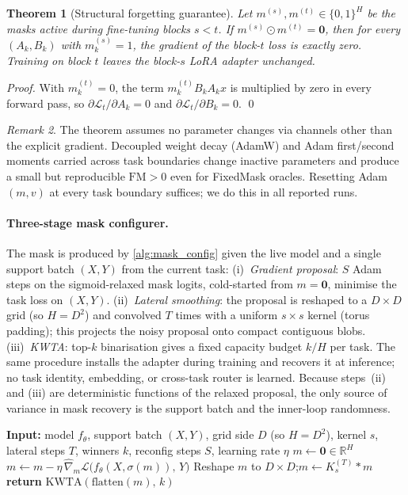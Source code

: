 \documentclass{article}
\theoremstyle{plain}
\newtheorem{theorem}{Theorem}[section]
\theoremstyle{remark}
\newtheorem{remark}[theorem]{Remark}
\begin{document}
\begin{theorem}[Structural forgetting guarantee]
\label{thm:isolation}
Let $m^{(s)},m^{(t)}\in\{0,1\}^H$ be the masks active during fine-tuning blocks $s<t$. If $m^{(s)}\odot m^{(t)} = \mathbf{0}$, then for every $(A_k,B_k)$ with $m^{(s)}_k=1$, the gradient of the block-$t$ loss is exactly zero. Training on block $t$ leaves the block-$s$ LoRA adapter unchanged.
\end{theorem}
\begin{proof}
With $m^{(t)}_k=0$, the term $m^{(t)}_k B_k A_k x$ is multiplied by zero in every forward pass, so $\partial\mathcal{L}_t/\partial A_k = 0$ and $\partial\mathcal{L}_t/\partial B_k = 0$. \qed
\end{proof}
\begin{remark}\label{rem:caveats}
The theorem assumes no parameter changes via channels other than the explicit gradient. Decoupled weight decay (AdamW) and Adam first/second moments carried across task boundaries change inactive parameters and produce a small but reproducible $\mathrm{FM}>0$ even for FixedMask oracles. Resetting Adam $(m,v)$ at every task boundary suffices; we do this in all reported runs.
\end{remark}

\paragraph{Three-stage mask configurer.}
The mask is produced by \cref{alg:mask_config} given the live model and a single support batch $(X,Y)$ from the current task:
(i)~\emph{Gradient proposal}: $S$ Adam steps on the sigmoid-relaxed mask logits, cold-started from $m=\mathbf{0}$, minimise the task loss on $(X,Y)$.
(ii)~\emph{Lateral smoothing}: the proposal is reshaped to a $D\times D$ grid (so $H = D^2$) and convolved $T$ times with a uniform $s\times s$ kernel (torus padding); this projects the noisy proposal onto compact contiguous blobs.
(iii)~\emph{KWTA}: top-$k$ binarisation gives a fixed capacity budget $k/H$ per task.
The same procedure installs the adapter during training and recovers it at inference; no task identity, embedding, or cross-task router is learned. Because steps~(ii) and (iii) are deterministic functions of the relaxed proposal, the only source of variance in mask recovery is the support batch and the inner-loop randomness.

\begin{algorithm}[t]
\caption{\textsc{SmoothKWTA} configurer for LoRA-Mux}
\label{alg:mask_config}
\begin{algorithmic}[1]
\STATE \textbf{Input:} model $f_\theta$, support batch $(X,Y)$, grid side $D$ (so $H=D^2$), kernel $s$, lateral steps $T$, winners $k$, reconfig steps $S$, learning rate $\eta$
\STATE $m \leftarrow \mathbf{0} \in \mathbb{R}^{H}$
  \STATE $m \leftarrow m - \eta\,\widehat\nabla_m\mathcal{L}\bigl(f_\theta(X,\sigma(m)),\,Y\bigr)$
\ENDFOR
\STATE Reshape $m$ to $D\times D$;\quad $m \leftarrow K_s^{(T)}*m$
\STATE \textbf{return} $\mathrm{KWTA}(\mathrm{flatten}(m),\,k)$
\end{algorithmic}
\end{algorithm}
\end{document}
